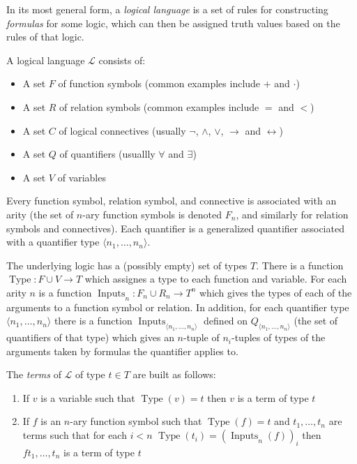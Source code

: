 \documentclass[12pt]{article}
\begin{document}
In its most general form, a \emph{logical language} is a set of rules for constructing \emph{formulas} for some logic, which can then be assigned truth values based on the rules of that logic.

A logical language $\mathcal{L}$ consists of:

\begin{itemize}
\item A set $F$ of function symbols (common examples include $+$ and $\cdot$)

\item A set $R$ of relation symbols (common examples include $=$ and $<$)

\item A set $C$ of logical connectives (usually $\neg$, $\wedge$, $\vee$, $\rightarrow$ and $\leftrightarrow$)

\item A set $Q$ of quantifiers (usuallly $\forall$ and $\exists$)

\item A set $V$ of variables
\end{itemize}

Every function symbol, relation symbol, and connective is associated with an arity (the set of $n$-ary function symbols is denoted $F_n$, and similarly for relation symbols and connectives).  Each quantifier is a generalized quantifier associated with a quantifier type $\langle n_1,\ldots,n_n\rangle$.

The underlying logic has a (possibly empty) set of types $T$.  There is a function $\operatorname{Type}:F\cup V\rightarrow T$ which assignes a type to each function and variable.  For each arity $n$ is a function $\operatorname{Inputs}_n:F_n\cup R_n\rightarrow T^n$ which gives the types of each of the arguments to a function symbol or relation.  In addition, for each quantifier type $\langle n_1,\ldots,n_n\rangle$ there is a function $\operatorname{Inputs}_{\langle n_1,\ldots,n_n\rangle}$ defined on $Q_{\langle n_1,\ldots,n_n\rangle}$ (the set of quantifiers of that type) which gives an $n$-tuple of $n_i$-tuples of types of the arguments taken by formulas the quantifier applies to.

The \emph{terms} of $\mathcal{L}$ of type $t\in T$ are built as follows:

\begin{enumerate}
\item If $v$ is a variable such that $\operatorname{Type}(v)=t$ then $v$ is a term of type $t$

\item If $f$ is an $n$-ary function symbol such that $\operatorname{Type}(f)=t$ and $t_1,\ldots,t_n$ are terms such that for each $i<n$ $\operatorname{Type}(t_i)=(\operatorname{Inputs}_n(f))_i$ then $ft_1,\ldots,t_n$ is a term of type $t$
\end{enumerate}
\end{document}
